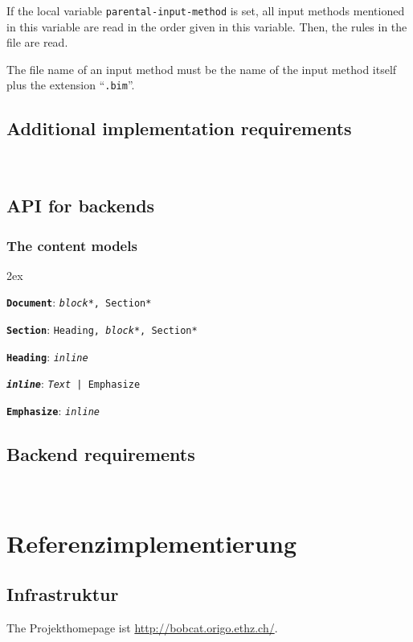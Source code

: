 \documentclass[12pt,openany]{book}
\begin{document}
If the local variable \verb|parental-input-method| is set, all input methods
mentioned in this variable are read in the order given in this variable.  Then,
the rules in the file are read.

The file name of an input method must be the name of the input method itself
plus the extension ``\verb|.bim|''.

\section{Additional implementation requirements}

~

\section{API for backends}

\subsection{The content models}

\begingroup\parindent0pt\parskip2ex
\newcommand{\element}[2]{\texttt{\textbf{#1}}: \texttt{#2}}

\element{Document}{\textit{block}*, Section*}

\element{Section}{Heading, \textit{block}*, Section*}

\element{Heading}{\textit{inline}}

\element{\textit{inline}}{\textit{Text} | Emphasize}

\element{Emphasize}{\textit{inline}}

\endgroup

\section{Backend requirements}

~


\chapter{Referenzimplementierung}

\section{Infrastruktur}

The Projekthomepage ist \url{http://bobcat.origo.ethz.ch/}.
\end{document}
